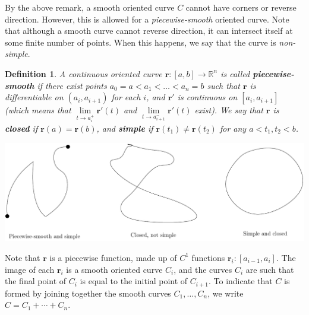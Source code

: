 \documentclass[12pt,letterpaper]{article}
\newtheorem{definition}[theorem]{Definition}
\newcommand{\R}{\mathbb{R}}
\renewcommand{\r}{\mathbf{r}}
\begin{document}
By the above remark, a smooth oriented curve $C$ cannot have corners or reverse direction. However, this is allowed for a {\em piecewise-smooth} oriented curve. Note that although a smooth curve cannot reverse direction, it can intersect itself at some finite number of points. When this happens, we say that the curve is {\em non-simple}.
\begin{definition}
A continuous oriented curve $\r:[a,b]\to\R^n$ is called {\bf piecewise-smooth} if there exist points $a_0=a<a_1<\ldots <a_n=b$ such that $\r$ is differentiable on $(a_i,a_{i+1})$ for each $i$, and $\r'$ is continuous on $[a_i,a_{i+1}]$ (which means that $\lim\limits_{t\to a_i^+}\r'(t)$ and $\lim\limits_{t\to a_{i+1}^-}\r'(t)$ exist).  We say that $\r$ is {\bf closed} if $\r(a)=\r(b)$, and {\bf simple} if $\r(t_1)\neq \r(t_2)$ for any $a<t_1,t_2<b$.
\end{definition}
\begin{center}
\includegraphics[width=5.5in]{curves_eg.pdf}
\end{center}
Note that $\r$ is a piecewise function, made up of $C^1$ functions $\r_i:[a_{i-1},a_i]$. The image of each $\r_i$ is a smooth oriented curve $C_i$, and the curves $C_i$ are such that the final point of $C_i$ is equal to the initial point of $C_{i+1}$. To indicate that $C$ is formed by joining together the smooth curves $C_1, \ldots, C_n$, we write $C=C_1+\cdots +C_n$.
\end{document}
